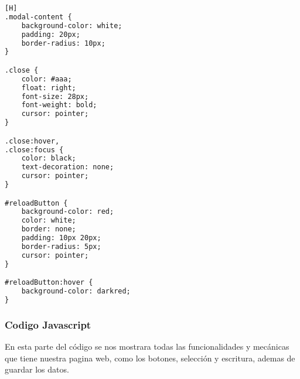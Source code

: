 \documentclass[14pt]{article}
\begin{document}
\begin{lstlisting}[language=html,caption={Code CSS}][H]
.modal-content {
    background-color: white;
    padding: 20px;
    border-radius: 10px;
}

.close {
    color: #aaa;
    float: right;
    font-size: 28px;
    font-weight: bold;
    cursor: pointer;
}

.close:hover,
.close:focus {
    color: black;
    text-decoration: none;
    cursor: pointer;
}

#reloadButton {
    background-color: red;
    color: white;
    border: none;
    padding: 10px 20px;
    border-radius: 5px;
    cursor: pointer;
}

#reloadButton:hover {
    background-color: darkred;
}

    \end{lstlisting}

    \subsubsection{Codigo Javascript}
    En esta parte del código se nos mostrara todas las funcionalidades y mecánicas que tiene nuestra pagina web, como los botones, selección y escritura, ademas de guardar los datos.
\end{document}
